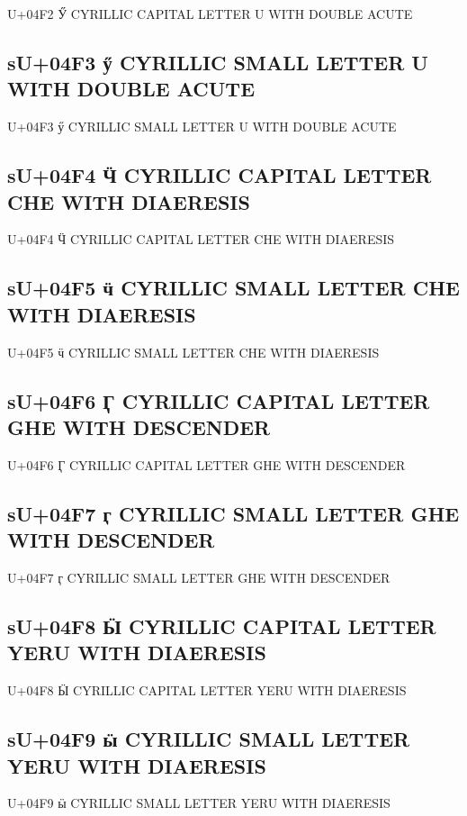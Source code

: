 U+04F2 Ӳ  CYRILLIC CAPITAL LETTER U WITH DOUBLE ACUTE

\subsection{sU+04F3 ӳ  CYRILLIC SMALL LETTER U WITH DOUBLE ACUTE}

U+04F3 ӳ  CYRILLIC SMALL LETTER U WITH DOUBLE ACUTE

\subsection{sU+04F4 Ӵ  CYRILLIC CAPITAL LETTER CHE WITH DIAERESIS}

U+04F4 Ӵ  CYRILLIC CAPITAL LETTER CHE WITH DIAERESIS

\subsection{sU+04F5 ӵ  CYRILLIC SMALL LETTER CHE WITH DIAERESIS}

U+04F5 ӵ  CYRILLIC SMALL LETTER CHE WITH DIAERESIS

\subsection{sU+04F6 Ӷ  CYRILLIC CAPITAL LETTER GHE WITH DESCENDER}

U+04F6 Ӷ  CYRILLIC CAPITAL LETTER GHE WITH DESCENDER

\subsection{sU+04F7 ӷ  CYRILLIC SMALL LETTER GHE WITH DESCENDER}

U+04F7 ӷ  CYRILLIC SMALL LETTER GHE WITH DESCENDER

\subsection{sU+04F8 Ӹ  CYRILLIC CAPITAL LETTER YERU WITH DIAERESIS}

U+04F8 Ӹ  CYRILLIC CAPITAL LETTER YERU WITH DIAERESIS

\subsection{sU+04F9 ӹ  CYRILLIC SMALL LETTER YERU WITH DIAERESIS}

U+04F9 ӹ  CYRILLIC SMALL LETTER YERU WITH DIAERESIS

